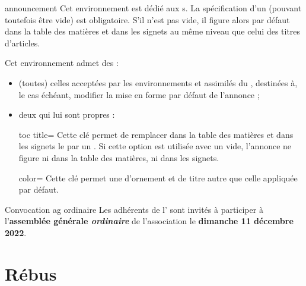 \documentclass{letgut}
\begin{document}
\begin{docEnvironment}[doclang/environment content=annonce,doc new and updated={2023-01-14}{2023-05-21}]{announcement}{}
  Cet environnement est dédié aux s. La spécification d'un
   (pouvant toutefois être vide) est obligatoire. S'il n'est pas
  vide, il figure alors par défaut dans la table des matières et dans les
  signets au même niveau que celui des titres d'articles.

  Cet environnement admet des  :
  \begin{itemize}
  \item (toutes) celles acceptées par les environnements  et
    assimilés du , destinées à, le cas échéant, modifier la
    mise en forme par défaut de l'annonce ;
  \item deux qui lui sont propres :
    \begin{docKey}[][doc new and updated={2023-05-21}{2023-11-08}]{toc title}{=}{\valinitdef}
      Cette clé permet de remplacer dans la table des matières et dans les
      signets le  par un . Si cette option
      est utilisée avec un  vide, l'annonce ne figure ni
      dans la table des matières, ni dans les signets.
    \end{docKey}
    \begin{docKey}[][doc new={2023-05-21}]{color}{=}{}
      Cette clé permet une  d'ornement et de titre autre que celle
      appliquée par défaut.
    \end{docKey}
  \end{itemize}
\end{docEnvironment}

\begin{ltx-code-result}[title addon=annonces]
\begin{announcement}[toc title={Exemple d'annonce},color=red!35!black]{Convocation \acs{ag} ordinaire}
  Les adhérents de l'\assogut{} sont invités à participer à
  l'\textbf{assemblée générale \emph{ordinaire}} de l'association
  le \textbf{dimanche 11 décembre 2022}.
\end{announcement}
\end{ltx-code-result}

\section{Rébus}
\label{sec:rebus}
\end{document}
